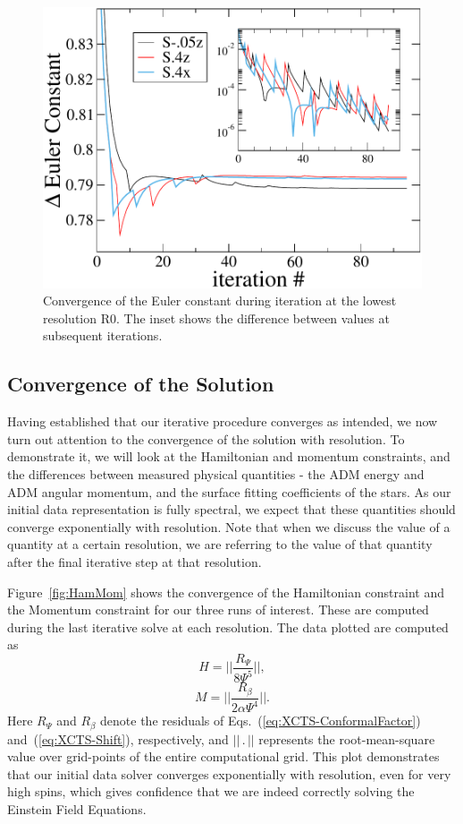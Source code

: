 \begin{figure}
\includegraphics[width=0.95\columnwidth]{chap2/EulerConstConvergence}
\caption[Iterative convergence of the Euler constant.]{\label{fig:EulerConstConvergence}
Convergence of the Euler
  constant during iteration at the lowest resolution R0. The inset shows the difference
  between values at subsequent iterations.}
\end{figure}

\subsection{Convergence of the Solution}

Having established that our iterative procedure converges as intended,
we now turn out attention to the convergence of the solution with
resolution. 
To demonstrate it, we will look at the Hamiltonian and
momentum constraints, and the differences between measured physical
quantities - the ADM energy and ADM angular momentum, and the surface
fitting coefficients of the stars. As our initial data representation
is fully spectral, we expect that these quantities should converge
exponentially with resolution. Note that when we discuss the value of
a quantity at a certain resolution, we are referring to the value of
that quantity after the final iterative step at that
resolution. 

Figure~\ref{fig:HamMom} shows the convergence of the Hamiltonian
constraint and the Momentum constraint for our three runs of
interest. These are computed during the last iterative solve at each
resolution. The data plotted are computed as
\begin{equation}
H = ||\frac{R_\Psi}{8\Psi^5}||,
\end{equation}
\begin{equation}
M = ||\frac{R_{\beta}}{2\alpha\Psi^4}||.
\end{equation}
Here $R_\Psi$ and $R_\beta$ denote the residuals of Eqs.~(\ref{eq:XCTS-ConformalFactor}) and~(\ref{eq:XCTS-Shift}), respectively, and $||\,.\,||$ represents the root-mean-square value over grid-points of
the
 entire computational grid. 
This plot demonstrates that our initial
data solver converges  exponentially with resolution, even for
very high spins, which gives confidence that we are indeed correctly
solving the Einstein Field Equations.

